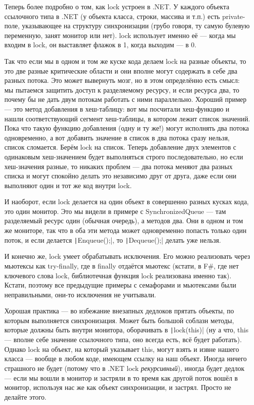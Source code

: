 \documentclass[a5paper]{article}
\begin{document}
Теперь более подробно о том, как lock устроен в .NET. У каждого объекта ссылочного типа в .NET (у объекта класса, строки, массива и т.п.) есть private-поле, указывающее на структуру синхронизации (грубо говоря, ту самую булевую переменную, занят монитор или нет). lock использует именно её --- когда мы входим в lock, он выставляет флажок в 1, когда выходим --- в 0. 

Так что если мы в одном и том же куске кода делаем lock на разные объекты, то это две разные критические области и они вполне могут содержать в себе два разных потока. Это может вывернуть мозг, но в этом определённо есть смысл: мы пытаемся защитить доступ к разделяемому ресурсу, и если ресурса два, то почему бы не дать двум потокам работать с ними параллельно. Хороший пример --- это метод добавления в хеш-таблицу: вот мы посчитали хеш-функцию и нашли соответствующий сегмент хеш-таблицы, в котором лежит список значений. Пока что такую функцию добавления (одну и ту же!) могут исполнять два потока одновременно, а вот добавить значение в список в два потока сразу нельзя, список сломается. Берём lock на список. Теперь добавление двух элементов с одинаковым хеш-значением будет выполняться строго последовательно, но если хеш-значения разные, то никаких проблем --- два потока меняют два разных списка и могут спокойно делать это независимо друг от друга, даже если они выполняют один и тот же код внутри lock. 

И наоборот, если lock делается на один объект в совершенно разных кусках кода, это один монитор. Это мы видели в примере с SynchronizedQueue --- там разделяемый ресурс один (обычная очередь), а методов два. Они в одном и том же мониторе, так что в оба эти метода может одновременно попасть только один поток, и если делается \texttt|Enqueue();|, то \texttt|Dequeue();| делать уже нельзя.

И конечно же, lock умеет обрабатывать исключения. Его можно реализовать через мьютексы как try-finally, где в finally отдаётся мьютекс (кстати, в F\#, где нет ключевого слова lock, библиотечная функция lock реализована именно так). Кстати, поэтому все предыдущие примеры с семафорами и мьютексами были неправильными, они-то исключения не учитывали.

Хорошая практика --- во избежание внезапных дедлоков прятать объекты, по которым выполняется синхронизация. Может быть большой соблазн методы, которые должны быть внутри монитора, оборачивать в \texttt|lock(this)| (ну а что, this --- вполне себе значение ссылочного типа, оно всегда есть, всё будет работать). Однако lock на объект, на который указывает this, могут взять и извне нашего класса --- вообще в любом коде, имеющем ссылку на наш объект. Иногда ничего страшного не будет (потому что в .NET lock \textit{рекурсивный}), иногда будет дедлок --- если мы вошли в монитор и застряли в то время как другой поток вошёл в монитор, используя нас же как объект синхронизации, и застрял. Просто не делайте этого.
\end{document}
